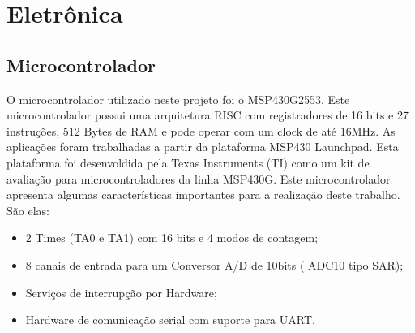 \chapter{Eletrônica}
\label{eletronica}

\section{Microcontrolador} %
\label{sec:msp430}

O microcontrolador utilizado neste projeto foi o MSP430G2553. Este microcontrolador possui uma arquitetura RISC com registradores de 16 bits e 27 instruções, 512 Bytes de RAM e pode operar com um clock de até 16MHz. As aplicações foram trabalhadas a partir da plataforma MSP430 Launchpad. Esta plataforma foi desenvoldida pela Texas Instruments (TI) como um kit de avaliação para microcontroladores da linha MSP430G. Este microcontrolador apresenta algumas características importantes para a realização deste trabalho. São elas:
\begin {itemize}
	\item 2 Times (TA0 e TA1) com 16 bits e 4 modos de contagem;
	\item 8 canais de entrada para um Conversor A/D de 10bits ( ADC10 tipo SAR);
	\item Serviços de interrupção por Hardware;
	\item Hardware de comunicação serial com suporte para UART.
\end {itemize}

